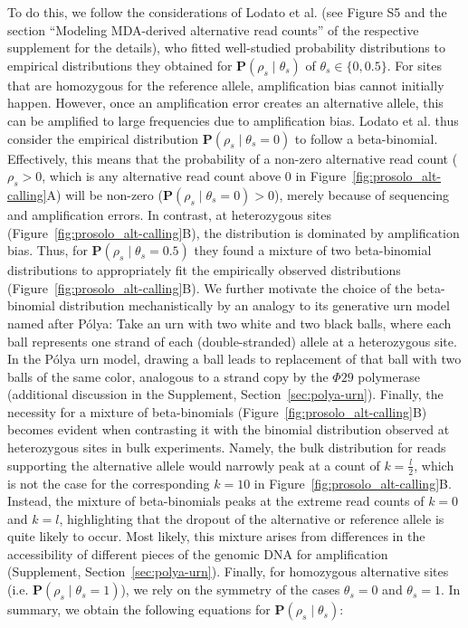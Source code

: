 \documentclass[12pt,inline]{wlscirep}
\begin{document}
To do this, we follow the considerations of Lodato et al.\cite{lodato_somatic_2015} (see Figure S5 and the section ``Modeling MDA-derived alternative read counts'' of the respective supplement for the details), who fitted well-studied probability distributions to empirical distributions they obtained for $\mathbf{P}(\rho_s\mid\theta_s)$ of $\theta_s\in\{0,0.5\}$.
For sites that are homozygous for the reference allele, amplification bias cannot initially happen.
However, once an amplification error creates an alternative allele, this can be amplified to large frequencies due to amplification bias.
Lodato et al.\cite{lodato_somatic_2015} thus consider the empirical distribution $\mathbf{P}(\rho_s\mid\theta_s=0)$ to follow a beta-binomial.
Effectively, this means that the probability of a non-zero alternative read count  ($\rho_s>0$, which is any alternative read count above $0$ in Figure~\ref{fig:prosolo_alt-calling}A) will be non-zero ($\mathbf{P}(\rho_s\mid\theta_s=0)>0$), merely because of sequencing and amplification errors.
In contrast, at heterozygous sites (Figure~\ref{fig:prosolo_alt-calling}B), the distribution is dominated by amplification bias.
Thus, for $\mathbf{P}(\rho_s\mid\theta_s=0.5)$ they found a mixture of two beta-binomial distributions to appropriately fit the empirically observed distributions (Figure~\ref{fig:prosolo_alt-calling}B).
We further motivate the choice of the beta-binomial distribution mechanistically by an analogy to its generative urn model named after Pólya\cite{eggenberger_uber_1923}:
Take an urn with two white and two black balls, where each ball represents one strand of each (double-stranded) allele at a heterozygous site.
In the Pólya urn model, drawing a ball leads to replacement of that ball with two balls of the same color, analogous to a strand copy by the $\Phi29$ polymerase (additional discussion in the Supplement, Section~\ref{sec:polya-urn}).
Finally, the necessity for a mixture of beta-binomials (Figure~\ref{fig:prosolo_alt-calling}B) becomes evident when contrasting it with the binomial distribution observed at heterozygous sites in bulk experiments.
Namely, the bulk distribution for reads supporting the alternative allele would narrowly peak at a count of $k=\frac{l}{2}$, which is not the case for the corresponding $k=10$ in Figure~\ref{fig:prosolo_alt-calling}B.
Instead, the mixture of beta-binomials peaks at the extreme read counts of $k=0$ and $k=l$, highlighting that the dropout of the alternative or reference allele is quite likely to occur.
Most likely, this mixture arises from differences in the accessibility of different pieces of the genomic DNA for amplification\cite{picher_trueprime_2016} (Supplement, Section~\ref{sec:polya-urn}).
Finally, for homozygous alternative sites (i.e. $\mathbf{P}(\rho_s\mid\theta_s=1)$), we rely on the symmetry of the cases $\theta_s=0$ and $\theta_s=1$.
In summary, we obtain the following equations for $\mathbf{P}(\rho_s\mid\theta_s)$:
\end{document}
